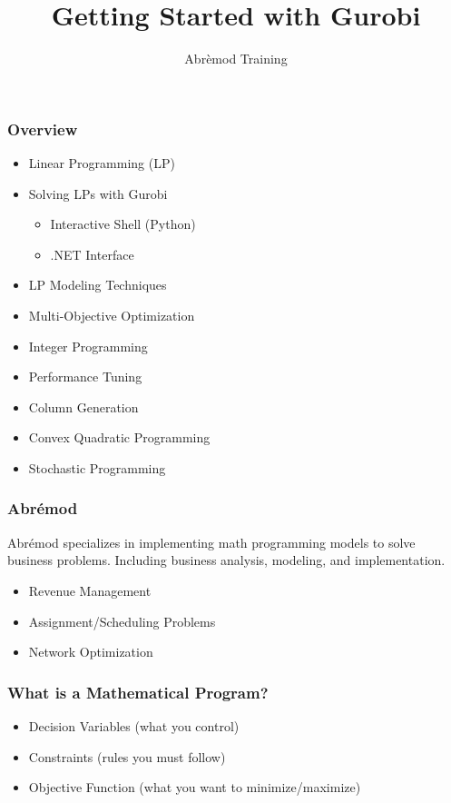 \documentclass[12pt,handout]{beamer}
\title{Getting Started with Gurobi}
\author{Abr\`emod Training}
\begin{document}
\begin{frame}
\titlepage
\end{frame}

\begin{frame}
\frametitle{Overview}
\begin{itemize}
\item Linear Programming (LP)
\item Solving LPs with Gurobi
    \begin{itemize}
    \item Interactive Shell (Python)
    \item .NET Interface
    \end{itemize}
\item LP Modeling Techniques
\item Multi-Objective Optimization
\item Integer Programming
\item Performance Tuning
\item Column Generation
\item Convex Quadratic Programming
\item Stochastic Programming
\end{itemize}
\end{frame}

\begin{frame}
  \frametitle{Abr\'emod}
Abr\'emod specializes in implementing math programming models to solve business problems.
Including business analysis, modeling, and implementation.
\begin{itemize}
\item Revenue Management
\item Assignment/Scheduling Problems
\item Network Optimization
\end{itemize}
\end{frame}

\begin{frame}
\frametitle{What is a Mathematical Program?}
\begin{itemize}
\item Decision Variables (what you control)
\item Constraints (rules you must follow)
\item Objective Function (what you want to minimize/maximize)
\end{itemize}
\end{frame}
\end{document}

